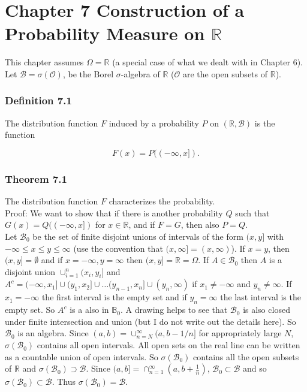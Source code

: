 \documentclass{article}
\begin{document}
{\newpage
\section*{Chapter 7 Construction of a Probability Measure on $\mathbb{R}$}

This chapter assumes $\Omega = \mathbb{R}$ (a special case of what we dealt with in Chapter 6). Let $\mathcal{B} = \sigma(\mathcal{O})$, be the Borel $\sigma$-algebra of $\mathbb{R}$ ($\mathcal{O}$ are the open subsets of $\mathbb{R}$). 

\subsubsection*{Definition 7.1}

The distribution function $F$ induced by a probability $P$ on $(\mathbb{R}, \mathcal{B})$ is the function 

$$
F(x) = P((-\infty , x]).
$$

\subsubsection*{Theorem 7.1}

The distribution function $F$ characterizes the probability. \\

Proof: We want to show that if there is another probability $Q$ such that $G(x) = Q((-\infty, x])$ for $x \in \mathbb{R}$, and if $F = G$, then also $P = Q$. \\

Let $\mathcal{B}_0$ be the set of finite disjoint unions of intervals of the form $(x,y]$ with $-\infty \leq x \leq y \leq \infty$ (use the convention that $(x,\infty] = (x,\infty)$). If $x = y$, then $(x,y] = \emptyset$ and if $x = -\infty, y = \infty$ then $(x,y] = \mathbb{R} = \Omega$. If $A \in \mathcal{B}_0$ then $A$ is a disjoint union $\cup_{i=1}^n (x_i, y_i]$ and $A^c = (-\infty, x_1] \cup (y_1, x_2] \cup \dots (y_{n-1}, x_n] \cup (y_n, \infty)$ if $x_1 \neq -\infty$ and $y_n \neq \infty$. If $x_1 = -\infty$ the first interval is the empty set and if $y_n = \infty$ the last interval is the empty set. So $A^c$ is a also in $\mathbb{B}_0$. A drawing helps to see that $\mathcal{B}_0$ is also closed under finite intersection and union (but I do not write out the details here). So $\mathcal{B}_0$ is an algebra. Since $(a,b) = \cup_{n=N}^\infty (a, b - 1/n]$ for appropriately large $N$, $\sigma(\mathcal{B}_0)$ contains all open intervals. All open sets on the real line can be written as a countable union of open intervals. So $\sigma(\mathcal{B}_0)$ contains all the open subsets of $\mathbb{R}$ and $\sigma(\mathcal{B}_0) \supset \mathcal{B}$. Since $(a,b] = \cap_{n=1}^\infty (a, b+\frac{1}{n})$, $\mathcal{B}_0 \subset \mathcal{B}$ and so $\sigma(\mathcal{B}_0) \subset \mathcal{B}$. Thus $\sigma(\mathcal{B}_0) = \mathcal{B}$. \\

}
\end{document}
